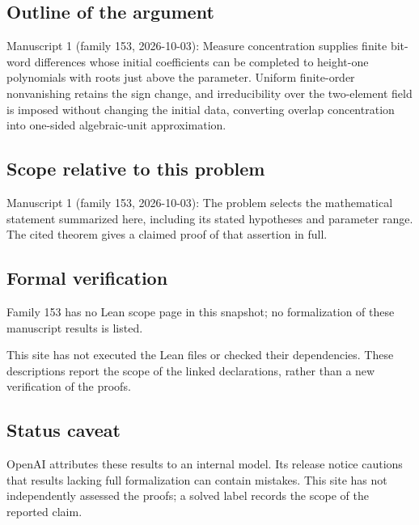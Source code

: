 \documentclass[11pt]{article}
\begin{document}
\subsection{Outline of the argument}
Manuscript 1 (family 153, 2026-10-03): Measure concentration supplies finite bit-word differences whose initial coefficients can be completed to height-one polynomials with roots just above the parameter. Uniform finite-order nonvanishing retains the sign change, and irreducibility over the two-element field is imposed without changing the initial data, converting overlap concentration into one-sided algebraic-unit approximation.

\subsection{Scope relative to this problem}
Manuscript 1 (family 153, 2026-10-03): The problem selects the mathematical statement summarized here, including its stated hypotheses and parameter range. The cited theorem gives a claimed proof of that assertion in full.

\subsection{Formal verification}
Family 153 has no Lean scope page in this snapshot; no formalization of these manuscript results is listed.

This site has not executed the Lean files or checked their dependencies. These descriptions report the scope of the linked declarations, rather than a new verification of the proofs.

\subsection{Status caveat}
OpenAI attributes these results to an internal model. Its release notice cautions that results lacking full formalization can contain mistakes. This site has not independently assessed the proofs; a solved label records the scope of the reported claim.
\end{document}
